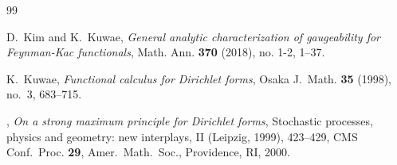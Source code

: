 \documentclass[12pt,a4paper]{article}
\newcommand{\1}{{\bf 1}}
\begin{document}
\begin{thebibliography}{99}
%
%
%
%


{D.~Kim and K.~Kuwae},
\emph{General analytic characterization of gaugeability for Feynman-Kac functionals}, Math. Ann. {\bf 370} (2018), no. 1-2, 1--37. 




%




      {K.~Kuwae}, 
      \emph{Functional calculus for Dirichlet forms}, 
Osaka J.~Math. {\bf 35} (1998), no.~3, 683--715. 

%

       \bysame, 
        \emph{On a strong maximum principle for Dirichlet forms}, 
        Stochastic processes, physics and geometry: 
        new interplays, II
        (Leipzig, 1999), 423--429, CMS Conf.~Proc. \textbf{29}, 
        Amer.~Math.~Soc., Providence, RI, 2000.
        

\end{thebibliography}
\end{document}
